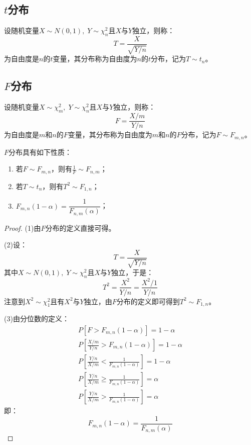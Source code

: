 \subsection{$t$分布}
\begin{definition}
	设随机变量$X\sim N(0,1),\;Y\sim\chi_n^2$且$X$与$Y$独立，则称：
	\begin{equation*}
		T=\frac{X}{\sqrt{Y/ n}}
	\end{equation*}
	为自由度是$n$的$t$变量，其分布称为自由度为$n$的$t$分布，记为$T\sim t_n$。
\end{definition}

\subsection{$F$分布}
\begin{definition}
	设随机变量$X\sim \chi_m^2,\;Y\sim\chi_n^2$且$X$与$Y$独立，则称：
	\begin{equation*}
		F=\frac{X/m}{Y/n}
	\end{equation*}
	为自由度是$m$和$n$的$F$变量，其分布称为自由度为$m$和$n$的$F$分布，记为$F\sim F_{m,n}$。
\end{definition}
\begin{property}\label{prop:FDistribution}
	$F$分布具有如下性质：
	\begin{enumerate}
		\item 若$F\sim F_{m,n}$，则有$\frac{1}{F}\sim F_{n,m}$；
		\item 若$T\sim t_n$，则有$T^2\sim F_{1,n}$；
		\item $F_{m,n}(1-\alpha)=\dfrac{1}{F_{n,m}(\alpha)}$；
	\end{enumerate}
\end{property}
\begin{proof}
	(1)由$F$分布的定义直接可得。\par
	(2)设：
	\begin{equation*}
		T=\frac{X}{\sqrt{Y/n}}
	\end{equation*}
	其中$X\sim N(0,1),\;Y\sim\chi_n^2$且$X$与$Y$独立，于是：
	\begin{equation*}
		T^2=\frac{X^2}{Y/n}=\frac{X^2/1}{Y/n}
	\end{equation*}
	注意到$X^2\sim\chi_1^2$且有$X^2$与$Y$独立，由$F$分布的定义即可得到$T^2\sim F_{1,n}$。\par
	(3)由分位数的定义：
	\begin{gather*}
		P[F>F_{m,n}(1-\alpha)]=1-\alpha \\
		P\left[\frac{X/m}{Y/n}>F_{m,n}(1-\alpha)\right]=1-\alpha \\
		P\left[\frac{Y/n}{X/m}<\frac{1}{F_{m,n}(1-\alpha)}\right]=1-\alpha \\
		P\left[\frac{Y/n}{X/m}\geqslant\frac{1}{F_{m,n}(1-\alpha)}\right]=\alpha \\
		P\left[\frac{Y/n}{X/m}>\frac{1}{F_{m,n}(1-\alpha)}\right]=\alpha
	\end{gather*}
	即：
	\begin{equation*}
		F_{m,n}(1-\alpha)=\frac{1}{F_{n,m}(\alpha)}
	\end{equation*}
\end{proof}